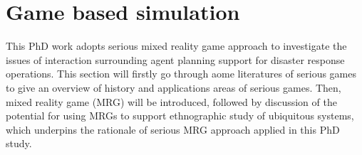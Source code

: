 \section{Game based simulation} \label{sec:LRMRgame}
This PhD work adopts serious mixed reality game approach to investigate the issues of interaction surrounding agent planning support for disaster response operations. This section will firstly go through aome literatures of serious games to give an overview of history and applications areas of serious games. Then, mixed reality game (MRG) will be introduced, followed by discussion of the potential for using MRGs to support ethnographic study of ubiquitous systems, which underpins the rationale of serious MRG approach applied in this PhD study.\\ 



